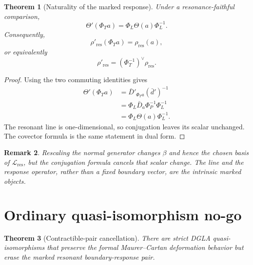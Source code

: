 \documentclass[11pt]{amsart}
\newtheorem{theorem}{Theorem}[section]
\newtheorem{remark}[theorem]{Remark}
\begin{document}
\begin{theorem}[Naturality of the marked response]
Under a resonance-faithful comparison,
\[
\boxed{
\Theta'(\Phi_Ta)=\Phi_L\Theta(a)\Phi_L^{-1}.}
\]
Consequently,
\[
\boxed{
\rho'_{\mathrm{res}}(\Phi_Ta)=\rho_{\mathrm{res}}(a),}
\]
or equivalently
\[
\rho'_{\mathrm{res}}=(\Phi_T^{-1})^\vee\rho_{\mathrm{res}}.
\]
\end{theorem}

\begin{proof}
Using the two commuting identities gives
\[
\begin{aligned}
\Theta'(\Phi_Ta)
&=\bar D'_{\Phi_Ta}(\bar d')^{-1}\\
&=\Phi_L\bar D_a\Phi_P^{-1}\Phi_L^{-1}\\
&=\Phi_L\Theta(a)\Phi_L^{-1}.
\end{aligned}
\]
The resonant line is one-dimensional, so conjugation leaves its scalar unchanged.  The covector formula is the same statement in dual form.
\end{proof}

\begin{remark}
Rescaling the normal generator changes \(\beta\) and hence the chosen basis of \(\mathcal L_{\mathrm{res}}\), but the conjugation formula cancels that scalar change.  The line and the response operator, rather than a fixed boundary vector, are the intrinsic marked objects.
\end{remark}

\section{Ordinary quasi-isomorphism no-go}

\begin{theorem}[Contractible-pair cancellation]
There are strict DGLA quasi-isomorphisms that preserve the formal Maurer--Cartan deformation behavior but erase the marked resonant boundary-response pair.
\end{theorem}
\end{document}

